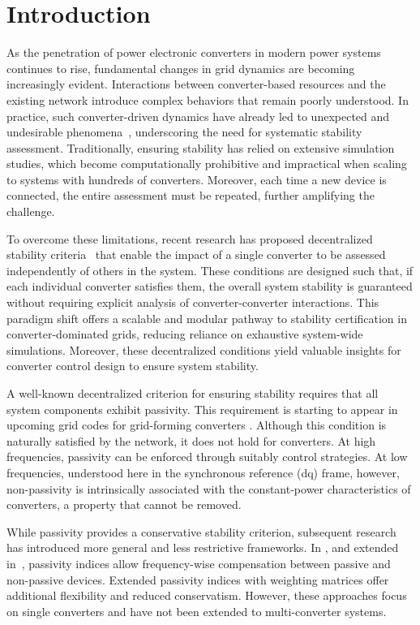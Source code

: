 \section{Introduction}
As the penetration of power electronic converters in modern power systems continues to rise, fundamental changes in grid dynamics are becoming increasingly evident. Interactions between converter-based resources and the existing network introduce complex behaviors that remain poorly understood. In practice, such converter-driven dynamics have already led to unexpected and undesirable phenomena~\cite{Cigre2024}, underscoring the need for systematic stability assessment. Traditionally, ensuring stability has relied on extensive simulation studies, which become computationally prohibitive and impractical when scaling to systems with hundreds of converters. Moreover, each time a new device is connected, the entire assessment must be repeated, further amplifying the challenge.

To overcome these limitations, recent research has proposed decentralized stability criteria~\cite{chenExtendedFrequencyDomainPassivity2025a,huangGainPhaseDecentralized2024,häberle2025decentralizedparametricstabilitycertificates} that enable the impact of a single converter to be assessed independently of others in the system. These conditions are designed such that, if each individual converter satisfies them, the overall system stability is guaranteed without requiring explicit analysis of converter-converter interactions. This paradigm shift offers a scalable and modular pathway to stability certification in converter-dominated grids, reducing reliance on exhaustive system-wide simulations. Moreover, these decentralized conditions yield valuable insights for converter control design to ensure system stability. 

A well-known decentralized criterion for ensuring stability requires that all system components exhibit passivity. This requirement is starting to appear in upcoming grid codes for grid-forming converters \cite{fingridGridCode}. Although this condition is naturally satisfied by the network, it does not hold for converters. At high frequencies, passivity can be enforced through suitably control strategies. 
At low frequencies, understood here in the synchronous reference (dq) frame,
however, non-passivity is intrinsically associated with the constant-power characteristics of converters, a property that cannot be removed. 

While passivity provides a conservative stability criterion, subsequent research has introduced more general and less restrictive frameworks.  In \cite{chenExtendedFrequencyDomainPassivity2025a}, and extended in~\cite{chenUnifiedFlexibleFrequencyDomain2025a}, passivity indices allow frequency-wise compensation between passive and non-passive devices. Extended passivity indices with weighting matrices offer additional flexibility and reduced conservatism. However, these approaches focus on single converters and have not been extended to multi-converter systems.

